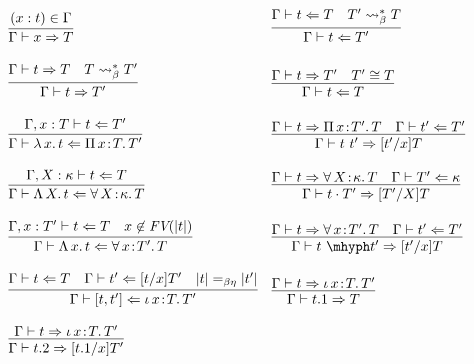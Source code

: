 \documentclass{article}
\newcommand{\abs}[4]{{#1}\, #2\! : \! #3.\, #4}
\newcommand{\absu}[3]{{#1}\, #2.\, #3}
\newcommand{\tpcheck}[0]{\Leftarrow}
\newcommand{\tpsynth}[0]{\Rightarrow}
\begin{document}
\begin{figure}
  \[
  \begin{array}{ll}
    \infer{\Gamma\vdash x\tpsynth T}{(x : t)\in\Gamma} &
    \infer{\Gamma\vdash t\tpcheck T'}{\Gamma\vdash t \tpcheck T & T' \leadsto^*_\beta T} \\ \\    
    \infer{\Gamma\vdash t\tpsynth T'}{\Gamma\vdash t \tpsynth T & T \leadsto^*_\beta T'} &
    \infer{\Gamma\vdash t\tpcheck T}{\Gamma\vdash t\tpsynth T' & T' \cong T} \\ \\    
    \infer{\Gamma\vdash \absu{\lambda}{x}{t} \tpcheck \abs{\Pi}{x}{T}{T'}}{\Gamma,x:T\vdash t\tpcheck T'} &
    \infer{\Gamma\vdash t\ t' \tpsynth [t'/x]T}{\Gamma\vdash t \tpsynth \abs{\Pi}{x}{T'}{T} & \Gamma\vdash t' \tpcheck T'} \\ \\

    \infer{\Gamma\vdash \absu{\Lambda}{X}{t} \tpcheck \abs{\forall}{X}{\kappa}{T}}{\Gamma,X:\kappa\vdash t \tpcheck T} &
    \infer{\Gamma\vdash t \cdot T' \tpsynth [T'/X]T}
          {\Gamma\vdash t \tpsynth \abs{\forall}{X}{\kappa}{T} & \Gamma\vdash T' \tpcheck\kappa} \\ \\

    \infer{\Gamma\vdash \absu{\Lambda}{x}{t} \tpcheck \abs{\forall}{x}{T'}{T}}{\Gamma,x:T'\vdash t \tpcheck T & x\not\in\textit{FV}(|t|)} &
    \infer{\Gamma\vdash t\ \mhyph t' \tpsynth [t'/x]T}{\Gamma\vdash t \tpsynth \abs{\forall}{x}{T'}{T} & \Gamma\vdash t' \tpcheck T'} \\ \\

    \infer{\Gamma\vdash [ t , t' ] \tpcheck \abs{\iota}{x}{T}{T'}}
          {\Gamma\vdash t \tpcheck T & \Gamma\vdash t' \tpcheck [t/x]T' & |t| =_{\beta\eta} |t'|} &
    \infer{\Gamma\vdash t.1 \tpsynth T}{\Gamma\vdash t \tpsynth \abs{\iota}{x}{T}{T'}} \\ \\
    \infer{\Gamma\vdash t.2 \tpsynth [t.1/x]T'}{\Gamma\vdash t \tpsynth \abs{\iota}{x}{T}{T'}} &


\end{array}\]
\end{figure}
\end{document}
